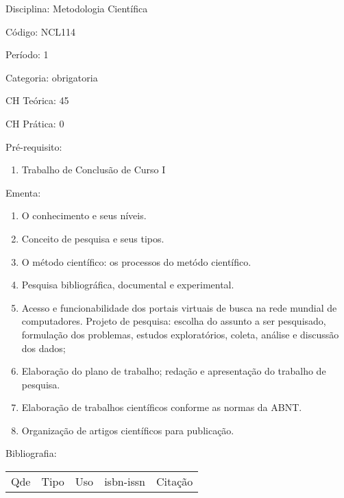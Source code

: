 \documentclass[12pt,a4paper,twoside]{report}
\begin{document}
Disciplina: Metodologia Científica

Código: NCL114

Período: 1

Categoria: obrigatoria

CH Teórica: 45

CH Prática: 0




Pré-requisito:
\begin{enumerate}
\item Trabalho de Conclusão de Curso I
\end{enumerate}

Ementa:
\begin{enumerate}
\item O conhecimento e seus níveis.
\item Conceito de pesquisa e seus tipos.
\item O método científico: os processos do metódo científico.
\item Pesquisa bibliográfica, documental e experimental.
\item Acesso e funcionabilidade dos portais virtuais de busca na rede mundial de computadores. Projeto de pesquisa: escolha do assunto a ser pesquisado, formulação dos problemas, estudos exploratórios, coleta, análise e discussão dos dados;
\item Elaboração do plano de trabalho; redação e apresentação do trabalho de pesquisa.
\item Elaboração de trabalhos científicos conforme as normas da ABNT.
\item Organização de artigos científicos para publicação.
\end{enumerate}



Bibliografia:


\begin{tabular}{llllp{8cm}}
Qde & Tipo & Uso & isbn-issn & Citação \\
\end{tabular}
\end{document}
